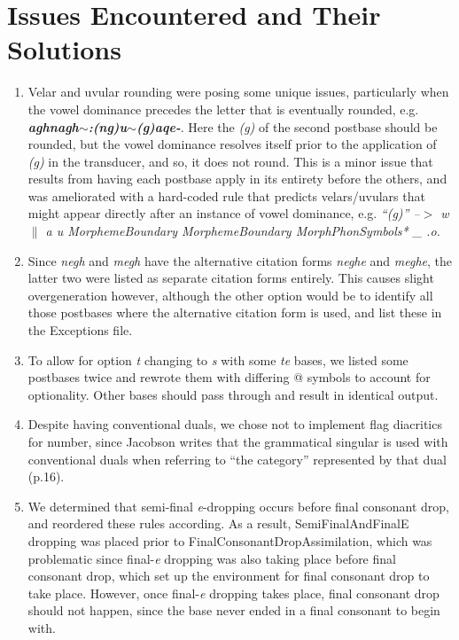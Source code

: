 \documentclass{article}
\begin{document}
\section{Issues Encountered and Their Solutions}

\begin{enumerate}

\item Velar and uvular rounding were posing some unique issues, particularly when the vowel dominance precedes the letter that is eventually rounded, e.g. \textit{\textbf{aghnagh$\sim$:(ng)u$\sim$(g)aqe-}}.
%
Here the \textit{(g)} of the second postbase should be rounded, but the vowel dominance resolves itself prior to the application of \textit{(g)} in the transducer, and so, it does not round.
%
This is a minor issue that results from having each postbase apply in its entirety before the others, and was ameliorated with a hard-coded rule that predicts velars/uvulars that might appear directly after an instance of vowel dominance, e.g. \textit{``(g)'' --$>$ w $\|$ a u MorphemeBoundary MorphemeBoundary MorphPhonSymbols* \_ .o.}

\item Since \textit{negh} and \textit{megh} have the alternative citation forms \textit{neghe} and \textit{meghe}, the latter two were listed as separate citation forms entirely.
%
This causes slight overgeneration however, although the other option would be to identify all those postbases where the alternative citation form is used, and list these in the Exceptions file.

\item To allow for option \textit{t} changing to \textit{s} with some \textit{te} bases, we listed some postbases twice and rewrote them with differing @ symbols to account for optionality.
%
Other bases should pass through and result in identical output.

\item Despite having conventional duals, we chose not to implement flag diacritics for number, since Jacobson writes that the grammatical singular is used with conventional duals when referring to “the category” represented by that dual (p.16).

\item We determined that semi-final \textit{e}-dropping occurs before final consonant drop, and reordered these rules according.
%
As a result, SemiFinalAndFinalE dropping was placed prior to FinalConsonantDropAssimilation, which was problematic since final-\textit{e} dropping was also taking place before final consonant drop, which set up the environment for final consonant drop to take place.
%
However, once final-\textit{e} dropping takes place, final consonant drop should not happen, since the base never ended in a final consonant to begin with.


\end{enumerate}
\end{document}
